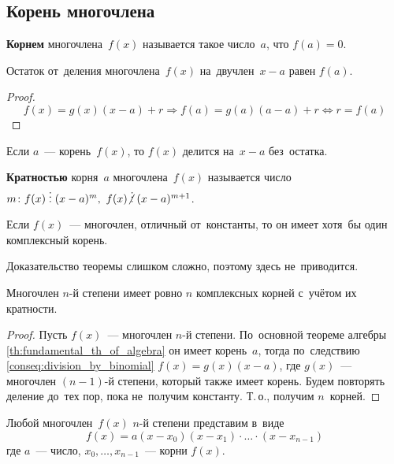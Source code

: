 \subsection{Корень многочлена}
\textbf{Корнем} многочлена~$f(x)$ называется такое число~$a$, что $f(a) = 0$.

\begin{theorem}[Безу]
Остаток от~деления многочлена~$f(x)$ на~двучлен~$x - a$ равен $f(a)$.
\end{theorem}
\begin{proof}
\begin{equation*}
f(x) = g(x)(x - a) + r \Rightarrow f(a) = g(a)(a - a) + r \Leftrightarrow r = f(a)
\end{equation*}
\end{proof}

\begin{consequent}
\label{conseq:division_by_binomial}
Если $a$~--- корень~$f(x)$, то $f(x)$ делится на~$x - a$ без~остатка.
\end{consequent}

\textbf{Кратностью} корня~$a$ многочлена~$f(x)$ называется число~
$m \colon f(x) \mult (x - a)^m, \ f(x) \notmult (x - a)^{m+1}$.

\begin{theorem}
\label{th:fundamental_th_of_algebra}
Если $f(x)$~--- многочлен, отличный от~константы, то он имеет хотя~бы один комплексный корень.
\end{theorem}%
Доказательство теоремы слишком сложно, поэтому здесь не~приводится.

\begin{consequent}
Многочлен $n$\nobreakdash-й степени имеет ровно $n$ комплексных корней с~учётом их кратности.
\end{consequent}
\begin{proof}
Пусть $f(x)$~--- многочлен $n$\nobreakdash-й степени.
По~основной теореме алгебры \ref{th:fundamental_th_of_algebra} он имеет корень~$a$, тогда по~следствию \ref{conseq:division_by_binomial} $f(x) = g(x)(x - a)$, где $g(x)$~--- многочлен $(n - 1)$\nobreakdash-й степени, который также имеет корень.
Будем повторять деление до~тех пор, пока не~получим константу.
Т.\,о., получим $n$~корней.
\end{proof}

\begin{consequent}
Любой многочлен~$f(x)$ $n$\nobreakdash-й степени представим в~виде
\begin{equation*}
f(x) = a(x - x_0)(x - x_1) \cdot \ldots \cdot (x - x_{n-1})
\end{equation*}
где $a$~--- число, $x_0, \ldots, x_{n-1}$~--- корни $f(x)$.
\end{consequent}

